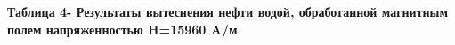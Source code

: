 
{\bfseries Таблица 4- Результаты вытеснения нефти водой, обработанной
магнитным полем напряженностью H=15960 A/м}

